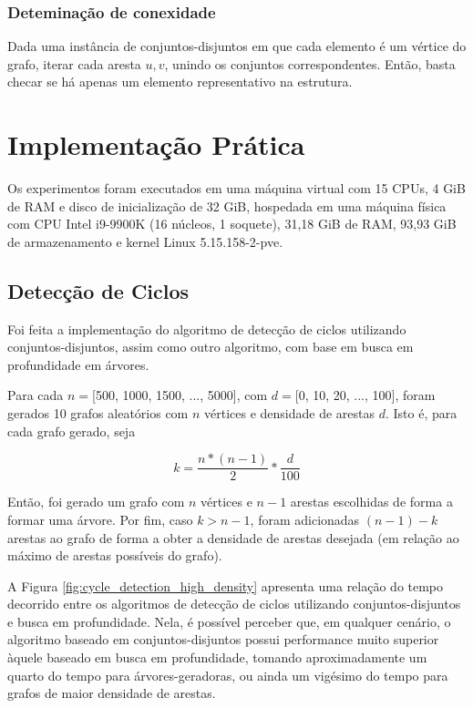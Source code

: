 \documentclass[article,a4paper,12pt,brazil,sumario=tradicional]{abntex2}
\theoremstyle{definition} %
\begin{document}
\subsubsection{Deteminação de conexidade}

Dada uma instância de conjuntos-disjuntos em que cada elemento é um vértice do grafo, iterar cada aresta $u, v$, unindo os conjuntos correspondentes. Então, basta checar se há apenas um elemento representativo na estrutura.



\section{Implementação Prática}

Os experimentos foram executados em uma máquina virtual com 15 CPUs, 4 GiB de RAM e disco de inicialização de 32 GiB, hospedada em uma máquina física com CPU Intel i9-9900K (16 núcleos, 1 soquete), 31,18 GiB de RAM, 93,93 GiB de armazenamento e kernel Linux 5.15.158-2-pve.

\subsection{Detecção de Ciclos}

Foi feita a implementação do algoritmo de detecção de ciclos utilizando conjuntos-disjuntos, assim como outro algoritmo, com base em busca em profundidade em árvores.

Para cada $n=$[500, 1000, 1500, ..., 5000], com $d=$[0, 10, 20, ..., 100], foram gerados 10 grafos aleatórios com $n$ vértices e densidade de arestas $d$. Isto é, para cada grafo gerado, seja 

\begin{equation*}
    k=\frac{n * (n - 1)}{2}*\frac{d}{100}
\end{equation*}

Então, foi gerado um grafo com $n$ vértices e $n - 1$ arestas escolhidas de forma a formar uma árvore. Por fim, caso $k > n - 1$, foram adicionadas $(n - 1) - k$ arestas ao grafo de forma a obter a densidade de arestas desejada (em relação ao máximo de arestas possíveis do grafo).

A Figura \ref{fig:cycle_detection_high_density} apresenta uma relação do tempo decorrido entre os algoritmos de detecção de ciclos utilizando conjuntos-disjuntos e busca em profundidade. Nela, é possível perceber que, em qualquer cenário, o algoritmo baseado em conjuntos-disjuntos possui performance muito superior àquele baseado em busca em profundidade, tomando aproximadamente um quarto do tempo para árvores-geradoras, ou ainda um vigésimo do tempo para grafos de maior densidade de arestas.
\end{document}

